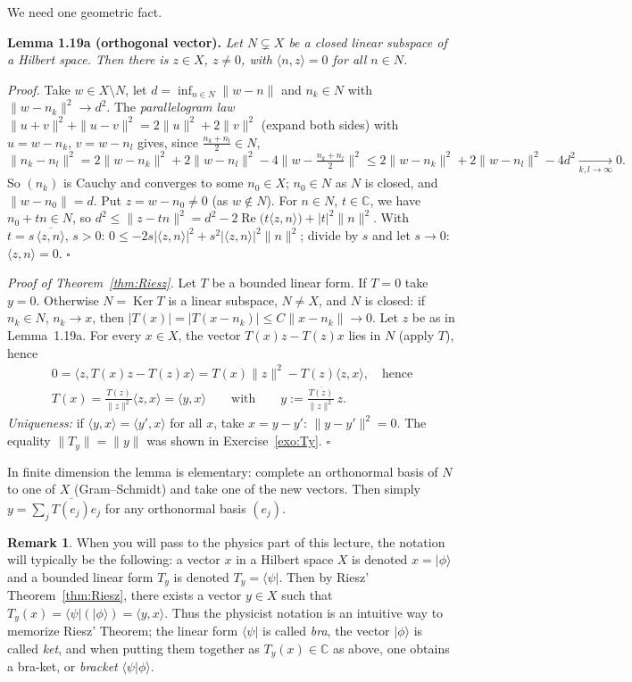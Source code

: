 \documentclass[11pt,a4paper]{article}
\numberwithin{equation}{section}
\newcommand{\C}{\mathbb{C}}
\newcommand{\ip}[2]{\langle #1, #2\rangle}
\newcommand{\ket}[1]{|#1\rangle}
\newcommand{\bra}[1]{\langle #1|}
\newcommand{\conj}[1]{\overline{#1}}
\DeclareMathOperator{\Ker}{Ker}
\DeclareMathOperator{\Real}{Re}
\theoremstyle{plain}
\theoremstyle{definition}
\newtheorem{remark}[theorem]{Remark}
\theoremstyle{plain}
\theoremstyle{definition}
\begin{document}
\begin{addition}
We need one geometric fact.

\smallskip\noindent\textbf{Lemma 1.19a (orthogonal vector).} \emph{Let $N\subsetneq X$ be a
closed linear subspace of a Hilbert space. Then there is $z\in X$, $z\ne0$, with
$\ip{n}{z}=0$ for all $n\in N$.}

\smallskip\noindent\emph{Proof.} Take $w\in X\setminus N$, let
$d=\inf_{n\in N}\|w-n\|$ and $n_k\in N$ with $\|w-n_k\|^2\to d^2$. The
\emph{parallelogram law} $\|u+v\|^2+\|u-v\|^2=2\|u\|^2+2\|v\|^2$ (expand both sides) with
$u=w-n_k$, $v=w-n_l$ gives, since $\frac{n_k+n_l}2\in N$,
\[
\|n_k-n_l\|^2=2\|w-n_k\|^2+2\|w-n_l\|^2-4\Big\|w-\tfrac{n_k+n_l}2\Big\|^2
\le2\|w-n_k\|^2+2\|w-n_l\|^2-4d^2\xrightarrow[k,l\to\infty]{}0 .
\]
So $(n_k)$ is Cauchy and converges to some $n_0\in X$; $n_0\in N$ as $N$ is closed, and
$\|w-n_0\|=d$. Put $z=w-n_0\ne0$ (as $w\notin N$). For $n\in N$, $t\in\C$, we have
$n_0+tn\in N$, so
$d^2\le\|z-tn\|^2=d^2-2\Real\big(t\ip{z}{n}\big)+|t|^2\|n\|^2$. With
$t=s\,\conj{\ip{z}{n}}$, $s>0$: $0\le-2s|\ip{z}{n}|^2+s^2|\ip{z}{n}|^2\|n\|^2$; divide by
$s$ and let $s\to0$: $\ip{z}{n}=0$. \hfill$\square$

\smallskip\noindent\emph{Proof of Theorem~\ref{thm:Riesz}.} Let $T$ be a bounded linear form.
If $T=0$ take $y=0$. Otherwise $N=\Ker T$ is a linear subspace, $N\ne X$, and $N$ is closed:
if $n_k\in N$, $n_k\to x$, then $|T(x)|=|T(x-n_k)|\le C\|x-n_k\|\to0$. Let $z$ be as in
Lemma~1.19a. For every $x\in X$, the vector $T(x)z-T(z)x$ lies in $N$ (apply $T$), hence
\begin{gather*}
0=\ip{z}{T(x)z-T(z)x}=T(x)\|z\|^2-T(z)\ip{z}{x},\quad\text{hence}\\
T(x)=\frac{T(z)}{\|z\|^2}\ip{z}{x}=\ip{y}{x}\qquad\text{with}\qquad y:=\frac{\conj{T(z)}}{\|z\|^2}\,z .
\end{gather*}
\emph{Uniqueness:} if $\ip{y}{x}=\ip{y'}{x}$ for all $x$, take $x=y-y'$: $\|y-y'\|^2=0$.
The equality $\|T_y\|=\|y\|$ was shown in Exercise~\ref{exo:Ty}. \hfill$\square$

\smallskip In finite dimension the lemma is elementary: complete an orthonormal basis of
$N$ to one of $X$ (Gram--Schmidt) and take one of the new vectors. Then simply
$y=\sum_j\conj{T(e_j)}e_j$ for any orthonormal basis $(e_j)$.
\end{addition}

\begin{remark}\label{rem:braket}
When you will pass to the physics part of this lecture, the notation will typically be the
following: a vector $x$ in a Hilbert space $X$ is denoted $x=\ket{\phi}$ and a bounded
linear form $T_y$ is denoted $T_y=\bra{\psi}$. Then by Riesz' Theorem~\ref{thm:Riesz},
there exists a vector $y\in X$ such that $T_y(x)=\bra{\psi}(\ket{\phi})=\ip{y}{x}$. Thus the
physicist notation is an intuitive way to memorize Riesz' Theorem; the linear form
$\bra{\psi}$ is called \emph{bra}, the vector $\ket{\phi}$ is called \emph{ket}, and when
putting them together as $T_y(x)\in\C$ as above, one obtains a bra-ket, or
\emph{bracket} $\langle\psi|\phi\rangle$.
\end{remark}
\end{document}

